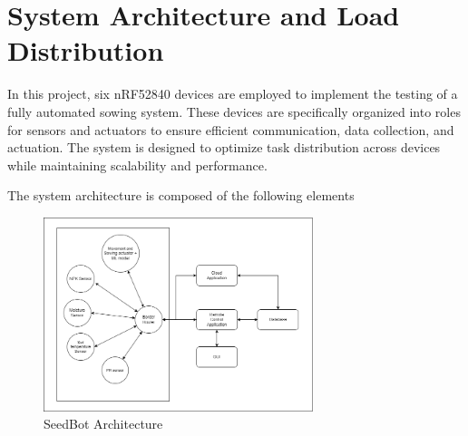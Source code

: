 \chapter{System Architecture and Load Distribution}

In this project, six nRF52840 devices are employed to implement the testing of a fully automated sowing system. These devices are specifically organized into roles for sensors and actuators to ensure efficient communication, data collection, and actuation. The system is designed to optimize task distribution across devices while maintaining scalability and performance.

The system architecture is composed of the following elements


\begin{figure}[H]
    \centering
    \includegraphics[width=0.7\textwidth]{media/IoT_architecture.png}
    \caption{SeedBot Architecture}
    \label{fig:SeedBot Architecture}
\end{figure}

